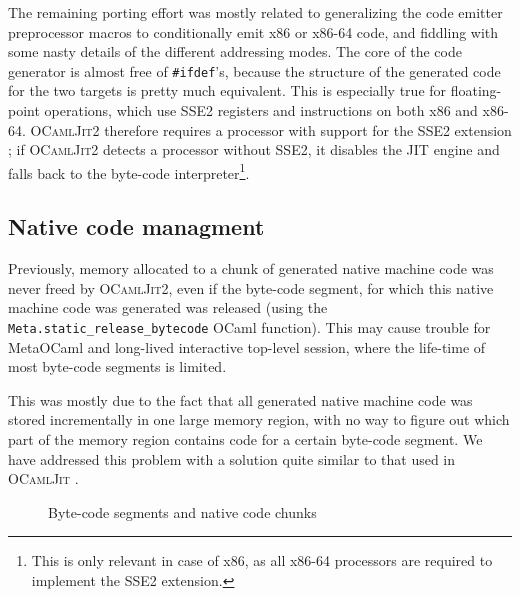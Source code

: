 \documentclass[12pt,a4paper,final]{article}
\begin{document}
The remaining porting effort was mostly related to generalizing the code
emitter preprocessor macros to conditionally emit x86 or x86-64 code, and fiddling with
some nasty details of the different addressing modes. The core of the code
generator is almost free of \texttt{\#ifdef}'s, because the structure of the generated code
for the two targets is pretty much equivalent. This is especially true for
floating-point operations, which use SSE2 registers and instructions on
both x86 and x86-64. \textsc{OCamlJit2} therefore requires a processor
with support for the SSE2 extension \cite{Intel10Vol1}; if \textsc{OCamlJit2} detects a
processor without SSE2, it disables the JIT engine and falls back to
the byte-code interpreter\footnote{This is only relevant in case of x86,
as all x86-64 processors are required to implement the SSE2 extension.}.

\subsection{Native code managment} \label{subsection:Native_code_management}

Previously, memory allocated to a chunk of generated native machine code was never freed
by \textsc{OCamlJit2}, even if the byte-code segment, for which this native machine code
was generated was released (using the \texttt{Meta.static\_release\_bytecode} OCaml
function). This may cause trouble for MetaOCaml \cite{Taha06} and long-lived interactive
top-level session, where the life-time of most byte-code segments is limited.

This was mostly due to the fact that all generated native machine code was stored 
incrementally in one large memory region, with no way to figure out which part of
the memory region contains code for a certain byte-code segment. We have addressed
this problem with a solution quite similar to that used in \textsc{OCamlJit}
\cite{Starynkevitch04}.

\begin{figure}[htb]
  \centering
  \caption{Byte-code segments and native code chunks}
  \label{figure:Byte_code_segments_and_native_code_chunks}
\end{figure}
\end{document}
